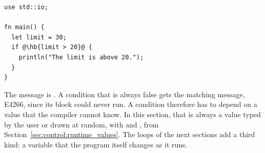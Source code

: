 \begin{lstlisting}[style=coloredverbatimError, escapechar=@, caption=A decision the compiler can already make]
use std::io;

fn main() {
  let limit = 30;
  if @\hb{limit > 20}@ {
    println("The limit is above 20.");
  }
}
\end{lstlisting}

The message is . A condition that is always false gets the matching
message, E4266, since its
block could never run. A condition therefore has to depend on a value that the
compiler cannot know. In this section, that is always a value typed by the user
or drawn at random, with  and , from
Section~\ref{sec:control:runtime_values}. The loops of the next sections add a
third kind: a variable that the program itself changes as it runs.


